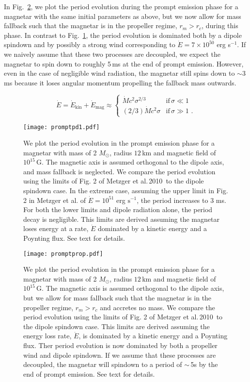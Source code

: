 \documentclass{article}
\begin{document}
In Fig.~\ref{fig:pprop}, we plot the period evolution during the prompt emission phase for a magnetar with the same initial parameters as above, but we now allow for mass fallback such that the magnetar is in the propeller regime, $r_m > r_c$, during this phase. In contrast to Fig.~\ref{fig:7}, the period evolution is dominated both by a dipole spindown and by possibly a strong wind corresponding to $\dot{E} = 7 \times 10^{50}$ erg s$^{-1}$. If we naively assume that these two processes are decoupled, we expect the magnetar to spin down to roughly 5\,ms at the end of prompt emission. However, even in the case of negligible wind radiation, the magnetar still spins down to $\sim 3$\,ms because it loses angular momentum propelling the fallback mass outwards.

\begin{equation}\label{eq:edot}
\dot{E} =\dot{E}_\mathrm{kin}+\dot{E}_\mathrm{mag} \approx
\begin{cases}
\dot{M} c^2 \sigma^{2/3}& \text{if}\, \sigma \ll 1 \\
(2/3) \dot{M} c^2 \sigma & \text{if}\, \sigma \gg 1\,\,.
\end{cases}
\end{equation}

\begin{figure}[h!]
\centering
\texttt{[image: promptpd1.pdf]}
\caption{We plot the period evolution in the prompt emission phase for a magnetar with mass of 2 $M_{\odot}$, radius $12$\,km and magnetic field of $10^{15}$\,G. The magnetic axis is assumed orthogonal to the dipole axis, and mass fallback is neglected. We compare the period evolution using the limits of Fig. 2 of Metzger et al.\,2010\,\cite{Metzger:2010pp} to the dipole spindown case. In the extreme case, assuming the upper limit in Fig. 2 in Metzger et al. of $\dot{E}=10^{51}$ erg $\mathrm{s}^{-1}$, the period increases to 3 ms. For both the lower limits and dipole radiation alone, the period decay is negligible. This limits are derived assuming the magnetar loses energy at a rate, $\dot{E}$ dominated by a kinetic energy and a Poynting flux. See text for details.}
\label{fig:7}
\end{figure}

\begin{figure}[h!]
\centering
\texttt{[image: promptprop.pdf]}
\caption{We plot the period evolution in the prompt emission phase for a magnetar with mass of 2 $M_{\odot}$, radius $12$\,km and magnetic field of $10^{15}$\,G. The magnetic axis is assumed orthogonal to the dipole axis, but we allow for mass fallback such that the magnetar is in the propeller regime, $r_m > r_c$ and accretes no mass. We compare the period evolution using the limits of Fig. 2 of Metzger et al.\,2010\,\cite{Metzger:2010pp} to the dipole spindown case. This limits are derived assuming the energy loss rate, $\dot{E}$, is dominated by a kinetic energy and a Poynting flux. Ther period evolution is now dominated by both a propeller wind and dipole spindown. If we assume that these processes are decoupled, the magnetar will spindown to a period of $\sim$\,5s by the end of prompt emission. See text for details.}
\label{fig:pprop}
\end{figure}
\end{document}
